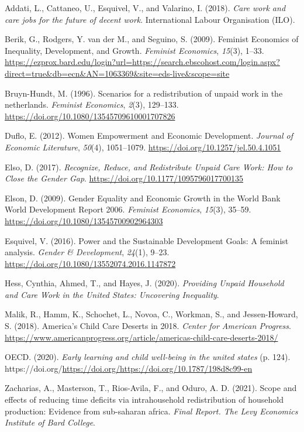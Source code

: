 \documentclass[
  11pt,
]{article}
\newlength{\cslhangindent}
\newenvironment{CSLReferences}[2] %
 {\begin{list}{}{%
  \setlength{\itemindent}{0pt}
  \setlength{\leftmargin}{0pt}
  \setlength{\parsep}{0pt}
  \ifodd #1
   \setlength{\leftmargin}{\cslhangindent}
   \setlength{\itemindent}{-1\cslhangindent}
  \fi
  \setlength{\itemsep}{#2\baselineskip}}}
 {\end{list}}
\begin{document}
\label{refs}
\begin{CSLReferences}{1}{0}
Addati, L., Cattaneo, U., Esquivel, V., and Valarino, I. (2018).
\emph{Care work and care jobs for the future of decent work}.
International Labour Organisation (ILO).

Berik, G., Rodgers, Y. van der M., and Seguino, S. (2009). Feminist
{Economics} of {Inequality}, {Development}, and {Growth}. \emph{Feminist
Economics}, \emph{15}(3), 1--33.
\url{https://ezprox.bard.edu/login?url=https://search.ebscohost.com/login.aspx?direct=true&db=ecn&AN=1063369&site=eds-live&scope=site}

Bruyn-Hundt, M. (1996). Scenarios for a redistribution of unpaid work in
the netherlands. \emph{Feminist Economics}, \emph{2}(3), 129--133.
\url{https://doi.org/10.1080/13545709610001707826}

Duflo, E. (2012). Women {Empowerment} and {Economic} {Development}.
\emph{Journal of Economic Literature}, \emph{50}(4), 1051--1079.
\url{https://doi.org/10.1257/jel.50.4.1051}

Elso, D. (2017). \emph{Recognize, {Reduce}, and {Redistribute} {Unpaid}
{Care} {Work}: {How} to {Close} the {Gender} {Gap}}.
\url{https://doi.org/10.1177/1095796017700135}

Elson, D. (2009). Gender {Equality} and {Economic} {Growth} in the
{World} {Bank} {World} {Development} {Report} 2006. \emph{Feminist
Economics}, \emph{15}(3), 35--59.
\url{https://doi.org/10.1080/13545700902964303}

Esquivel, V. (2016). Power and the {Sustainable} {Development} {Goals}:
A feminist analysis. \emph{Gender \& Development}, \emph{24}(1), 9--23.
\url{https://doi.org/10.1080/13552074.2016.1147872}

Hess, Cynthia, Ahmed, T., and Hayes, J. (2020). \emph{Providing {Unpaid}
{Household} and {Care} {Work} in the {United} {States}: {Uncovering}
{Inequality}}.

Malik, R., Hamm, K., Schochet, L., Novoa, C., Workman, S., and
Jessen-Howard, S. (2018). America's {Child} {Care} {Deserts} in 2018.
\emph{Center for American Progress}.
\url{https://www.americanprogress.org/article/americas-child-care-deserts-2018/}

OECD. (2020). \emph{Early learning and child well-being in the united
states} (p. 124).
https://doi.org/\url{https://doi.org/https://doi.org/10.1787/198d8c99-en}

Zacharias, A., Masterson, T., Rios-Avila, F., and Oduro, A. D. (2021).
Scope and effects of reducing time deficits via intrahousehold
redistribution of household production: Evidence from sub-saharan
africa. \emph{Final Report. The Levy Economics Institute of Bard
College}.

\end{CSLReferences}
\end{document}
